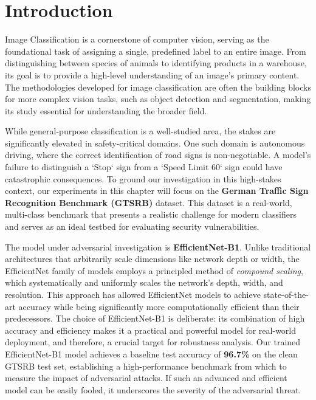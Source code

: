 \documentclass[../main.tex]{subfiles}
\begin{document}
\section{Introduction}
\label{sec:classification_intro}

Image Classification is a cornerstone of computer vision, serving as the foundational task of assigning a single, predefined label to an entire image. From distinguishing between species of animals to identifying products in a warehouse, its goal is to provide a high-level understanding of an image's primary content. The methodologies developed for image classification are often the building blocks for more complex vision tasks, such as object detection and segmentation, making its study essential for understanding the broader field.

While general-purpose classification is a well-studied area, the stakes are significantly elevated in safety-critical domains. One such domain is autonomous driving, where the correct identification of road signs is non-negotiable. A model's failure to distinguish a `Stop` sign from a `Speed Limit 60` sign could have catastrophic consequences. To ground our investigation in this high-stakes context, our experiments in this chapter will focus on the \textbf{German Traffic Sign Recognition Benchmark (GTSRB)} dataset. This dataset is a real-world, multi-class benchmark that presents a realistic challenge for modern classifiers and serves as an ideal testbed for evaluating security vulnerabilities.

The model under adversarial investigation is \textbf{EfficientNet-B1}. Unlike traditional architectures that arbitrarily scale dimensions like network depth or width, the EfficientNet family of models employs a principled method of \textit{compound scaling}, which systematically and uniformly scales the network's depth, width, and resolution. This approach has allowed EfficientNet models to achieve state-of-the-art accuracy while being significantly more computationally efficient than their predecessors. The choice of EfficientNet-B1 is deliberate: its combination of high accuracy and efficiency makes it a practical and powerful model for real-world deployment, and therefore, a crucial target for robustness analysis. Our trained EfficientNet-B1 model achieves a baseline test accuracy of \textbf{96.7\%} on the clean GTSRB test set, establishing a high-performance benchmark from which to measure the impact of adversarial attacks. If such an advanced and efficient model can be easily fooled, it underscores the severity of the adversarial threat.
\end{document}
